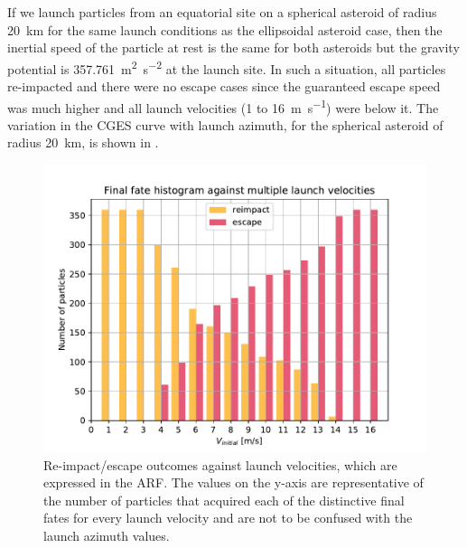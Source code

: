 %
If we launch particles from an equatorial site on a spherical asteroid of radius \SI{20}{\kilo\metre} for the same launch conditions as the ellipsoidal asteroid case, then the inertial speed of the particle at rest is the same for both asteroids but the gravity potential is \SI{357.761}{\metre\squared\per\second\squared} at the launch site. In such a situation, all particles re-impacted and there were no escape cases since the guaranteed escape speed was much higher and all launch velocities (1 to \SI{16}{\metre\per\second}) were below it. The variation in the \gls{CGES} curve with launch azimuth, for the spherical asteroid of radius \SI{20}{\kilo\metre}, is shown in .
\begin{figure}[htb]
\centering
\captionsetup{justification=centering}
\includegraphics[width=\textwidth, height=0.4\textheight, keepaspectratio=true]{Images/longest_edge_no_perturbations/final_fate_histogram_all_velocities.pdf}
\caption{Re-impact/escape outcomes against launch velocities, which are expressed in the \gls{ARF}. The values on the y-axis are representative of the number of particles that acquired each of the distinctive final fates for every launch velocity and are not to be confused with the launch azimuth values.}
\label{fig:final_fate_hist_noSP}
\end{figure}
\FloatBarrier

